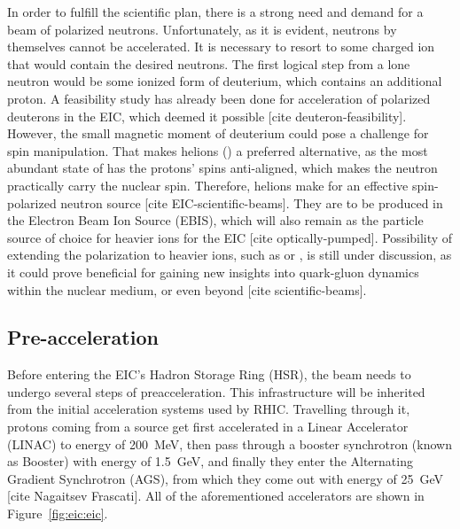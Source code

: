 In order to fulfill the scientific plan, there is a strong need and demand for a beam of polarized neutrons. Unfortunately, as it is evident, neutrons by themselves cannot be accelerated. It is necessary to resort to some charged ion that would contain the desired neutrons. The first logical step from a lone neutron would be some ionized form of deuterium, which contains an additional proton. A feasibility study has already been done for acceleration of polarized deuterons in the EIC, which deemed it possible [cite deuteron-feasibility]. However, the small magnetic moment of deuterium could pose a challenge for spin manipulation. That makes helions () a preferred alternative, as the most abundant state of  has the protons' spins anti-aligned, which makes the neutron practically carry the nuclear spin. Therefore, helions make for an effective spin-polarized neutron source [cite EIC-scientific-beams]. They are to be produced in the Electron Beam Ion Source (EBIS), which will also remain as the particle source of choice for heavier ions for the EIC [cite optically-pumped]. Possibility of extending the polarization to heavier ions, such as  or , is still under discussion, as it could prove beneficial for gaining new insights into quark-gluon dynamics within the nuclear medium, or even beyond [cite scientific-beams]. 

\subsection{Pre-acceleration}
Before entering the EIC's Hadron Storage Ring (HSR), the beam needs to undergo several steps of preacceleration. This infrastructure will be inherited from the initial acceleration systems used by RHIC. Travelling through it, protons coming from a source get first accelerated in a Linear Accelerator (LINAC) to energy of 200~MeV, then pass through a booster synchrotron (known as Booster) with energy of 1.5~GeV, and finally they enter the Alternating Gradient Synchrotron (AGS), from which they come out with energy of 25~GeV [cite Nagaitsev Frascati]. All of the aforementioned accelerators are shown in Figure~\ref{fig:eic:eic}.

